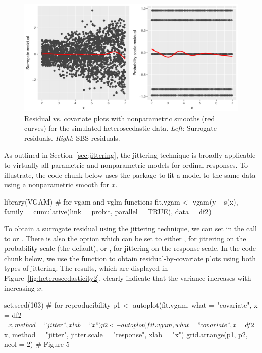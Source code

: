 \begin{figure}[!htbp]
  \centering
  \includegraphics[width=1\textwidth]{heteroscedasticity}
  \caption{Residual vs. covariate plots with nonparametric smooths (red curves) for the simulated heteroscedastic data. \textit{Left}: Surrogate residuals. \textit{Right}: SBS residuals.}
  \label{fig:heteroscedasticity}
\end{figure}

As outlined in Section~\ref{sec:jittering}, the jittering technique is broadly applicable to virtually all parametric and nonparametric models for ordinal responses. To illustrate, the code chunk below uses the  package to fit a  model to the same data using a nonparametric smooth for $x$.
\begin{example}
library(VGAM)  # for vgam and vglm functions
fit.vgam <- vgam(y ~ s(x), family = cumulative(link = probit, parallel = TRUE),
                 data = df2)
\end{example}

To obtain a surrogate residual using the jittering technique, we can set  in the call to  or . There is also the option  which can be set to either , for jittering on the probability scale (the default), or , for jittering on the response scale. In the code chunk below, we use the  function to obtain residual-by-covariate plots using both types of jittering. The results, which are displayed in Figure~\ref{fig:heteroscedasticity2}, clearly indicate that the variance increases with increasing $x$.
\begin{example}
set.seed(103)  # for reproducibility
p1 <- autoplot(fit.vgam, what = "covariate", x = df2$x, method = "jitter",
               xlab = "x")
p2 <- autoplot(fit.vgam, what = "covariate", x = df2$x, method = "jitter",
               jitter.scale = "response", xlab = "x")
grid.arrange(p1, p2, ncol = 2)  # Figure 5
\end{example}

